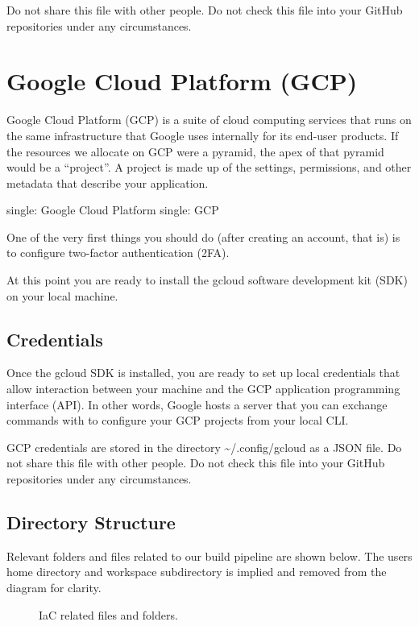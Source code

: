 \justify{}
Do not share this file with other people. Do not check this file into
your GitHub repositories under any circumstances.

\section{Google Cloud Platform (GCP)}

\justify{}
Google Cloud Platform (GCP) is a suite of cloud computing services that
runs on the same infrastructure that Google uses internally for its
end-user products. If the
resources we allocate on GCP were a pyramid, the apex of that pyramid
would be a ``project''. A project is made up of the settings, permissions,
and other metadata that describe your application.

single: Google Cloud Platform single: GCP

\justify{}
One of the very first things you should do (after creating an account,
that is) is to configure two-factor authentication
(2FA).

\justify{}
At this point you are ready to install the gcloud software development
kit (SDK) on your local machine.

\subsection{Credentials}

\justify{}
Once the gcloud SDK is installed, you are ready to set up local
credentials that allow interaction between your machine and the GCP
application programming interface (API). In other words, Google hosts a
server that you can exchange commands with to configure your GCP
projects from your local CLI.

\justify{}
GCP credentials are stored in the directory
\textasciitilde{}/.config/gcloud as a JSON file. Do not share this file
with other people. Do not check this file into your GitHub repositories
under any circumstances.

\clearpage
\subsection{Directory Structure}

\justify{}
Relevant folders and files related to our build pipeline are shown
below. The users home directory and workspace subdirectory is implied
and removed from the diagram for clarity.

\begin{figure}[!htb]
  
  \caption{IaC related files and folders.}
\label{infra}
\end{figure}
